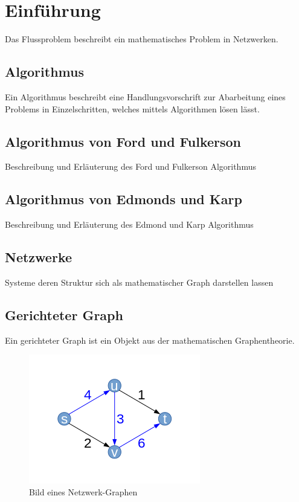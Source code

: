 \documentclass[11pt]{llncs}
\begin{document}

\newpage
\section{Einführung}
\label{Einfuehrung}
Das Flussproblem beschreibt ein mathematisches Problem in Netzwerken.

\subsection{Algorithmus}
\label{Algorithmus}
Ein Algorithmus beschreibt eine Handlungsvorschrift zur Abarbeitung eines Problems in Einzelschritten, welches mittels Algorithmen lösen lässt. 

\subsection{Algorithmus von Ford und Fulkerson}
Beschreibung und Erläuterung des Ford und Fulkerson Algorithmus

\subsection{Algorithmus von Edmonds und Karp}
Beschreibung und Erläuterung des Edmond und Karp Algorithmus

\subsection{Netzwerke}
\label{Netzwerke}
Systeme deren Struktur sich als mathematischer Graph darstellen lassen


\subsection{Gerichteter Graph}
\label{Graph}
Ein gerichteter Graph ist ein Objekt aus der mathematischen Graphentheorie.


\begin{figure}[htbp] 
  \centering
     \includegraphics{graph1} 
  \caption{Bild eines Netzwerk-Graphen}
  \label{fig:Graph1}
\end{figure}
\end{document}
